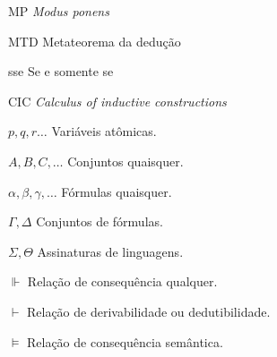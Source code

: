 



\listoftables*
\cleardoublepage

\begin{siglas}
	\item[MP] \textit{Modus ponens}
	\item[MTD] Metateorema da dedução
	\item[sse] Se e somente se
	\item[CIC] \textit{Calculus of inductive constructions}
\end{siglas}

\begin{simbolos}
    \item [$p, q, r\ldots$] Variáveis atômicas.
    \item [$A, B, C, \ldots$] Conjuntos quaisquer.
    \item [$\alpha, \beta, \gamma, \ldots$] Fórmulas quaisquer.
    \item [$\Gamma, \Delta$] Conjuntos de fórmulas.
    \item [$\Sigma, \Theta$] Assinaturas de linguagens.
    \item[$\Vdash$] Relação de consequência qualquer.
    \item[$\vdash$] Relação de derivabilidade ou dedutibilidade.
    \item[$\vDash$] Relação de consequência semântica.
\end{simbolos}


